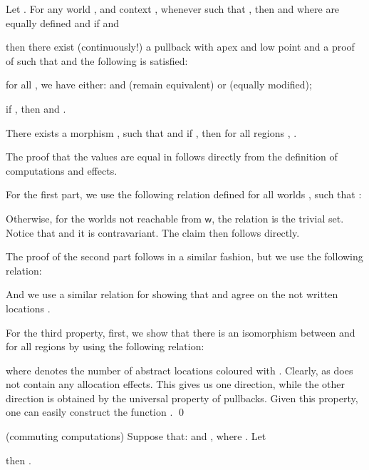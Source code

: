 \documentclass[orivec]{llncs}
\newif\iffull\fullfalse
\renewenvironment{proof}{\vspace{-1mm} \noindent {\bf Proof}\quad}{\qed}
\newcommand\w{\ensuremath{\mathsf{w}}\xspace}
\begin{document}
\begin{lemma}\label{lemmasix}
\label{lem:invariant}
Let . For any world ,
and context , whenever  such that , then  and
 where  are
equally defined  and if  and 

then there exist (continuously!) a pullback 
  with apex
 and low point  and a proof of  such that  and the following is satisfied:
\begin{compactenum}
 \item for all , we have either: 
and  (remain
equivalent) or
 (equally modified);
 \item if , then  and .

\item There exists a morphism , such that   and if
, then for all regions ,
. 
\end{compactenum}
\end{lemma}
\iffull\begin{proof}
The proof that the values are equal in  follows directly from 
the definition of computations and effects.


For the first part,  we use the following relation  defined for all
worlds , such that :



\noindent
Otherwise, for the worlds  not reachable from \w, the relation
 is the trivial set. Notice that  and it is
contravariant. The claim then 
follows directly.

The proof of the second part follows in a similar fashion, but we use the
following relation:



\noindent
And we use a similar relation for showing that  and
 agree on the not written locations .

For the third property, first, we show that there is an
isomorphism between  and  for all regions
 by using the following relation:



\noindent
where  denotes the number of abstract locations coloured with 
.
Clearly,  as  does not contain any allocation effects. This gives
us one direction, while the other direction is obtained by the universal
property of pullbacks. Given this property, one can easily construct the 
function .
\end{proof}
\begin{proposition}\label{compr}
(commuting computations) Suppose that:
 and
,
where  . Let 

then .
\end{proposition}
\end{document}
